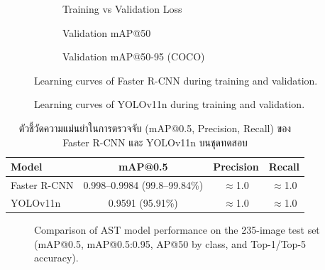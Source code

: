 \begin{figure}[H]
  \centering
  \begin{subfigure}[b]{0.32\textwidth}
    \centering
    \caption*{Training vs Validation Loss}
  \end{subfigure}\hfill
  \begin{subfigure}[b]{0.32\textwidth}
    \centering
    \caption*{Validation mAP@50}
  \end{subfigure}\hfill
  \begin{subfigure}[b]{0.32\textwidth}
    \centering
    \caption*{Validation mAP@50-95 (COCO)}
  \end{subfigure}
  \caption{Learning curves of Faster R-CNN during training and validation.}
  \label{fig:frcnn_learning_curves}
\end{figure}

\begin{figure}[H]
  \centering
  \caption{Learning curves of YOLOv11n during training and validation.}
  \label{fig:yolo_learning_curves}
\end{figure}

\begin{table}[H]
  \centering
  \caption{ตัวชี้วัดความแม่นยำในการตรวจจับ (mAP@0.5, Precision, Recall) ของ Faster R-CNN และ YOLOv11n บนชุดทดสอบ}
  \label{tab:map_metrics}
  \begin{tabular}{lccc}
    \toprule
    \textbf{Model} & \textbf{mAP@0.5} & \textbf{Precision} & \textbf{Recall} \\
    \midrule
    Faster R-CNN & 0.998--0.9984 (99.8--99.84\%) & $\approx$1.0 & $\approx$1.0 \\
    YOLOv11n     & 0.9591 (95.91\%)               & $\approx$1.0 & $\approx$1.0 \\
    \bottomrule
  \end{tabular}
\end{table}

\begin{figure}[H]
  \centering
  \caption[AST model comparison: mAP, AP50, and accuracy]{Comparison of AST model performance on the 235-image test set (mAP@0.5, mAP@0.5:0.95, AP@50 by class, and Top-1/Top-5 accuracy).}
  \label{fig:model_comparison_map_acc}
\end{figure}

